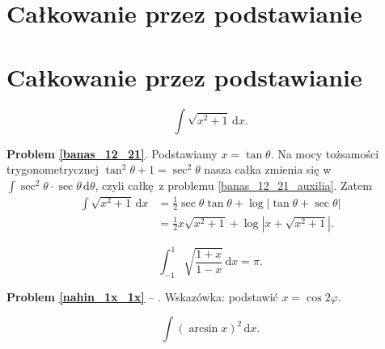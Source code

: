 \section{Całkowanie przez podstawianie}
\section{Całkowanie przez podstawianie} %


\begin{problem}
    \label{banas_12_21}%
    \begin{equation}
        \int \sqrt{x^2 + 1} \, \mathrm{d}x.
    \end{equation}
\end{problem}

\textbf{Problem \ref{banas_12_21}}. %
Podstawiamy $x = \tan \theta$. %
Na mocy tożsamości trygonometrycznej $\tan^2 \theta + 1 = \sec^2 \theta$ nasza całka zmienia się w $\int \sec^2 \theta \cdot \sec \theta \,\mathrm{d}\theta$, czyli całkę z problemu \ref{banas_12_21_auxilia}. %
Zatem %
\begin{align} %
    \int \sqrt{x^2 + 1} \, \mathrm{d}x & = \frac 12 \sec \theta \tan \theta + \log |\tan \theta + \sec \theta| \\ %
    & = \frac 1 2 x \sqrt{x^2 + 1} + \log \left|x + \sqrt{x^2+1}\right|. %
\end{align} %

\begin{problem}
    \label{nahin_1x_1x}%
    \begin{equation}
        \int_{-1}^1 \sqrt{\frac{1+x}{1-x}} \,\mathrm{d}x = \pi.
    \end{equation}
\end{problem}

\textbf{Problem \ref{nahin_1x_1x}} -- \cite[s. 115, 378]{nahin15}. %
Wskazówka: podstawić $x = \cos 2 \varphi$. %


\begin{problem}
    \label{banas_12_18}%
    \begin{equation}
        \int (\arcsin x)^2 \,\mathrm{d}x.
    \end{equation}
\end{problem}

